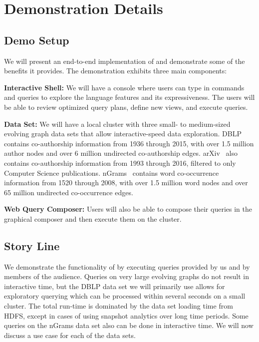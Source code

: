 \section{Demonstration Details}
\label{sec:demo}

\subsection{Demo Setup}
\label{sec:setup}

We will present an end-to-end implementation of \ql and demonstrate
some of the benefits it provides.  The demonstration exhibits three main
components:

{\bf Interactive Shell:} We will have a console where users can type
in \ql commands and queries to explore the language features and its
expressiveness.  The users will be able to review optimized query
plans, define new views, and execute queries.

{\bf Data Set:} We will have a local cluster with three small- to
medium-sized evolving graph data sets that allow interactive-speed
data exploration.  DBLP~\cite{dblp} contains co-authorship information
from 1936 through 2015, with over 1.5 million author nodes and over 6
million undirected co-authorship edges.  arXiv~\cite{arxiv} also
contains co-authorship information from 1993 through 2016, filtered to
only Computer Science publications.  nGrams~\cite{nGrams} contains
word co-occurrence information from 1520 through 2008, with over 1.5
million word nodes and over 65 million undirected co-occurrence edges.

{\bf Web Query Composer:} Users will also be able to compose their
queries in the graphical composer and then execute them on the
cluster.

\subsection{Story Line}
\label{sec:story}

We demonstrate the functionality of \ql by executing queries provided
by us and by members of the audience.  Queries on very large evolving
graphs do not result in interactive time, but the DBLP data set we
will primarily use allows for exploratory querying which can be processed
within several seconds on a small cluster.  The total run-time is
dominated by the data set loading time from HDFS, except in cases of
using snapshot analytics over long time periods. Some queries on the
nGrams data set also can be done in interactive time.  We will now
discuss a use case for each of the data sets.

